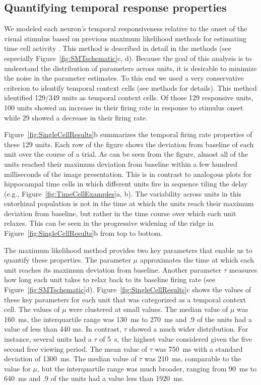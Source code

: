 \documentclass{apa}
\begin{document}
\subsection{Quantifying temporal response properties}
We modeled each neuron's temporal
responsiveness relative to the onset of the visual stimulus based on previous
maximum likelihood methods for estimating time cell activity
\cite{TigaEtal17}.  This method is described in detail in the methods (see
especially Figure~\ref{fig:SMTschematic}c, d).
Because the goal of this analysis is to understand the distribution of
parameters across units, it is desirable to minimize the noise in the
parameter estimates.  To this end we used a very conservative criterion to
identify temporal context cells (see methods for details). 
This method identified 129/349 units as temporal context cells.
Of those 129 responsive units, 100 units showed an increase in their firing rate in response to
stimulus onset while 29 showed a decrease in their firing rate.

Figure~\ref{fig:SingleCellResults}b summarizes the temporal firing rate
properties of these 129 units.  Each row of the figure shows the deviation from
baseline of each unit over the course of a trial. %
As can be seen from the figure, almost
all of the units reached their maximum deviation from baseline within a few
hundred milliseconds of the image presentation.  This is in contrast to
analogous plots for hippocampal time cells in which different units fire in
sequence tiling the delay (e.g., Figure~\ref{fig:TimeCellExamples}a, b).  The
variability across units in this entorhinal population is not in the time at
which the units reach their maximum deviation from baseline, but rather in the time
course over which each unit relaxes.  This can be seen in the progressive
widening of the ridge in Figure~\ref{fig:SingleCellResults}b from top to
bottom.  

The maximum likelihood method provides two key parameters that enable us to
quantify these properties.  The parameter $\mu$ approximates the time at which
each unit reaches its maximum deviation from baseline.  Another parameter
$\tau$ measures how long each unit takes to relax back to its baseline firing
rate (see Figure~\ref{fig:SMTschematic}d).
Figure~\ref{fig:SingleCellResults}c shows the values of these key
parameters for each unit that was categorized as a temporal context cell.  
The values of $\mu$ were clustered at small values.
The median value of $\mu$ was 160~ms, the interquartile range was 130~ms to
270~ms and .9 of the units had a value of less than 440 ms.
In contrast, $\tau$ showed a much wider distribution.  For
instance, several units had a $\tau$ of 5~s, the highest value 
considered given the five second free viewing period. 
The mean value of $\tau$ was 
750~ms with a standard deviation of 1300~ms.
The median value of $\tau$ was 210~ms, comparable to the value for $\mu$, but
the interquartile range was much broader, ranging from 90~ms to 640~ms and .9 of
the units had a value less than 1920~ms.  
\end{document}
